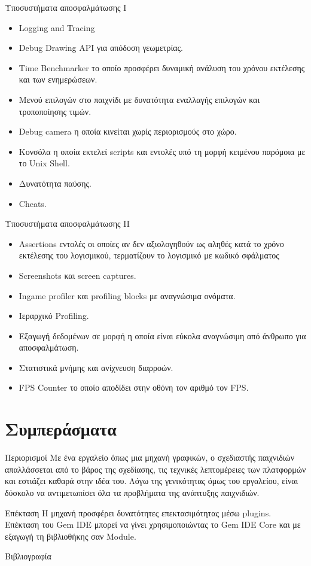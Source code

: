\documentclass{beamer}
\begin{document}
	\begin{frame}{Υποσυστήματα αποσφαλμάτωσης Ι}
		\begin{itemize}
			\item Logging and Tracing
			\item Debug Drawing API για απόδοση γεωμετρίας.
			\item Time Benchmarker το οποίο προσφέρει δυναμική ανάλυση του χρόνου εκτέλεσης και των ενημερώσεων.
			\item Μενού επιλογών στο παιχνίδι με δυνατότητα εναλλαγής επιλογών και τροποποίησης τιμών.
			\item Debug camera η οποία κινείται χωρίς περιορισμούς στο χώρο.
			\item Κονσόλα η οποία εκτελεί scripts και εντολές υπό τη μορφή κειμένου παρόμοια με το Unix Shell.
			\item Δυνατότητα παύσης.
			\item Cheats.		
		\end{itemize}
	\end{frame}			
	
	\begin{frame}{Υποσυστήματα αποσφαλμάτωσης II}
		\begin{itemize}	
			\item Assertions εντολές οι οποίες αν δεν αξιολογηθούν ως αληθές κατά το χρόνο εκτέλεσης του λογισμικού, τερματίζουν το λογισμικό με κωδικό σφάλματος						
			\item Screenshots και screen captures.
			\item Ιngame profiler και profiling blocks με αναγνώσιμα ονόματα.
			\item Ιεραρχικό Profiling.
			\item Εξαγωγή δεδομένων σε μορφή η οποία είναι εύκολα αναγνώσιμη από άνθρωπο για αποσφαλμάτωση.
			\item Στατιστικά μνήμης και ανίχνευση διαρροών.
			\item FPS Counter το οποίο αποδίδει στην οθόνη τον αριθμό τον FPS.
		\end{itemize}
	\end{frame}
	
	\section{Συμπεράσματα}
	\begin{frame}{Περιορισμοί}
		Με ένα εργαλείο όπως μια μηχανή γραφικών, ο σχεδιαστής παιχνιδιών απαλλάσσεται από το βάρος της σχεδίασης, τις τεχνικές λεπτομέρειες των πλατφορμών και εστιάζει καθαρά στην ιδέα του. Λόγω της γενικότητας όμως του εργαλείου, είναι δύσκολο να αντιμετωπίσει όλα τα προβλήματα της ανάπτυξης παιχνιδιών.
	\end{frame}		
	\begin{frame}{Επέκταση}
		Η μηχανή προσφέρει δυνατότητες επεκτασιμότητας μέσω plugins. \cite{Erl:2009:SDP:1538586}
		Επέκταση του \alert{Gem IDE} μπορεί να γίνει χρησιμοποιώντας το \alert{Gem IDE Core} και με εξαγωγή τη βιβλιοθήκης σαν \alert{Module}.
	\end{frame}		
	
	
	\begin{frame}[allowframebreaks]{Βιβλιογραφία}
		
		 
		
		
	\end{frame}
	
\end{document}
